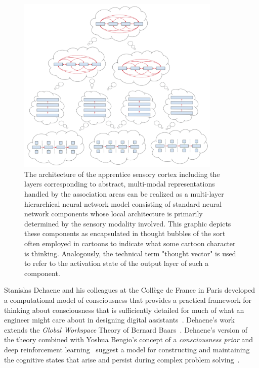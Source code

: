 \begin{figure}
%
  \begin{center} 
    \includegraphics[width=275pt]{./figures/Posterior_Cortex_Semantic_Memory.png} %
  \end{center}
%
  \caption{The architecture of the apprentice sensory cortex including the layers corresponding to abstract, multi-modal representations handled by the association areas can be realized as a multi-layer hierarchical neural network model consisting of standard neural network components whose local architecture is primarily determined by the sensory modality involved. This graphic depicts these components as encapsulated in thought bubbles of the sort often employed in cartoons to indicate what some cartoon character is thinking. Analogously, the technical term "thought vector" is used to refer to the activation state of the output layer of such a component.}
%
  \label{fig_Posterior_Cortex_Semantic_Memory}
%
\end{figure}


Stanislas Dehaene and his colleagues at the Coll\`{e}ge de France in Paris developed a computational model of consciousness that provides a practical framework for thinking about consciousness that is sufficiently detailed for much of what an engineer might care about in designing digital assistants~\cite{Dehaene2014}. Dehaene's work extends the {\it{Global Workspace}} Theory of Bernard Baars~\cite{Baars1988}. Dehaene's version of the theory combined with Yoshua Bengio's concept of a {\it{consciousness prior}} and deep reinforcement learning~\cite{MnihetalCoRR-13,NairetalCoRR-15} suggest a model for constructing and maintaining the cognitive states that arise and persist during complex problem solving~\cite{BengioCoRR-17}.


